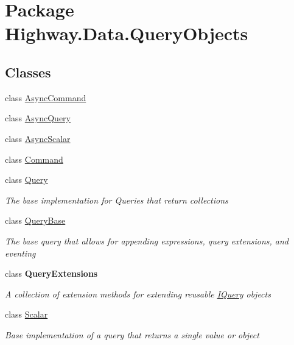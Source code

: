 \hypertarget{namespace_highway_1_1_data_1_1_query_objects}{\section{Package Highway.\-Data.\-Query\-Objects}
\label{namespace_highway_1_1_data_1_1_query_objects}
}
\subsection*{Classes}
\begin{DoxyCompactItemize}
\item 
class \hyperlink{class_highway_1_1_data_1_1_query_objects_1_1_async_command}{Async\-Command}
\item 
class \hyperlink{class_highway_1_1_data_1_1_query_objects_1_1_async_query-g}{Async\-Query}
\item 
class \hyperlink{class_highway_1_1_data_1_1_query_objects_1_1_async_scalar-g}{Async\-Scalar}
\item 
class \hyperlink{class_highway_1_1_data_1_1_query_objects_1_1_command}{Command}
\begin{DoxyCompactList}\small\item\em \end{DoxyCompactList}\item 
class \hyperlink{class_highway_1_1_data_1_1_query_objects_1_1_query-g}{Query}
\begin{DoxyCompactList}\small\item\em The base implementation for Queries that return collections \end{DoxyCompactList}\item 
class \hyperlink{class_highway_1_1_data_1_1_query_objects_1_1_query_base}{Query\-Base}
\begin{DoxyCompactList}\small\item\em The base query that allows for appending expressions, query extensions, and eventing \end{DoxyCompactList}\item 
class {\bfseries Query\-Extensions}
\begin{DoxyCompactList}\small\item\em A collection of extension methods for extending reusable \hyperlink{class_i_query-g}{I\-Query} objects \end{DoxyCompactList}\item 
class \hyperlink{class_highway_1_1_data_1_1_query_objects_1_1_scalar-g}{Scalar}
\begin{DoxyCompactList}\small\item\em Base implementation of a query that returns a single value or object \end{DoxyCompactList}\end{DoxyCompactItemize}
